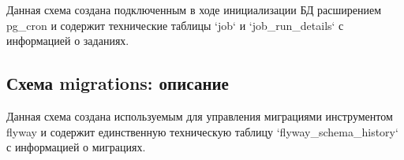 Данная схема создана подключенным в ходе инициализации БД расширением pg\_cron и содержит технические таблицы
`job` и `job\_run\_details` с информацией о заданиях.

\subsection{Схема migrations: описание}\label{subsec:migrationsdesc}

Данная схема создана используемым для управления миграциями инструментом flyway и содержит
единственную техническую таблицу `flyway\_schema\_history` с информацией о миграциях.